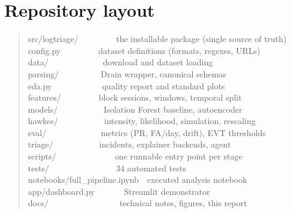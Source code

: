 \documentclass[11pt,a4paper]{report}
\begin{document}
\chapter{Repository layout}
\label{app:layout}
\begin{quote}\small\ttfamily
src/logtriage/\ \ \ \ \ \ \ \ \ the installable package (single source of
truth)\\
\hspace*{1em}config.py\ \ \ \ \ \ \ \ \ dataset definitions (formats,
regexes, URLs)\\
\hspace*{1em}data/\ \ \ \ \ \ \ \ \ \ \ \ \ download and dataset loading\\
\hspace*{1em}parsing/\ \ \ \ \ \ \ \ \ \ Drain wrapper, canonical schemas\\
\hspace*{1em}eda.py\ \ \ \ \ \ \ \ \ \ \ \ quality report and standard
plots\\
\hspace*{1em}features/\ \ \ \ \ \ \ \ \ block sessions, windows, temporal
split\\
\hspace*{1em}models/\ \ \ \ \ \ \ \ \ \ \ Isolation Forest baseline,
autoencoder\\
\hspace*{1em}hawkes/\ \ \ \ \ \ \ \ \ \ \ intensity, likelihood,
simulation, rescaling\\
\hspace*{1em}eval/\ \ \ \ \ \ \ \ \ \ \ \ \ metrics (PR, FA/day, drift),
EVT thresholds\\
\hspace*{1em}triage/\ \ \ \ \ \ \ \ \ \ \ incidents, explainer backends,
agent\\
scripts/\ \ \ \ \ \ \ \ \ \ \ \ \ \ one runnable entry point per stage\\
tests/\ \ \ \ \ \ \ \ \ \ \ \ \ \ \ \ 34 automated tests\\
notebooks/full\_pipeline.ipynb\ \ executed analysis notebook\\
app/dashboard.py\ \ \ \ \ \ \ Streamlit demonstrator\\
docs/\ \ \ \ \ \ \ \ \ \ \ \ \ \ \ \ \ technical notes, figures, this
report\\
\end{quote}
\end{document}
